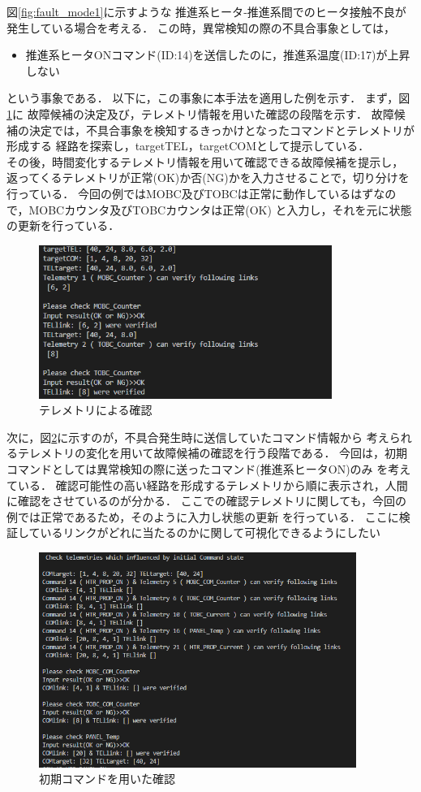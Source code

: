 \documentclass[11pt]{jsreport}
\begin{document}
図\ref{fig:fault_mode1}に示すような
推進系ヒータ‐推進系間でのヒータ接触不良が発生している場合を考える．
この時，異常検知の際の不具合事象としては，
\begin{itemize}
   \item 推進系ヒータONコマンド(ID:14)を送信したのに，推進系温度(ID:17)が上昇しない
\end{itemize}
という事象である．
以下に，この事象に本手法を適用した例を示す．
まず，図\ref{fig:tel_phase}に
故障候補の決定及び，テレメトリ情報を用いた確認の段階を示す．
故障候補の決定では，不具合事象を検知するきっかけとなったコマンドとテレメトリが形成する
経路を探索し，targetTEL，targetCOMとして提示している．\\
その後，時間変化するテレメトリ情報を用いて確認できる故障候補を提示し，
返ってくるテレメトリが正常(OK)か否(NG)かを入力させることで，切り分けを行っている．
今回の例ではMOBC及びTOBCは正常に動作しているはずなので，MOBCカウンタ及びTOBCカウンタは正常(OK)
と入力し，それを元に状態の更新を行っている．
\begin{figure}[H]
   \centering
      \includegraphics[height=5.0cm]{figure/COM14_TEL17_show_TEL_list.png}
      \caption{テレメトリによる確認}
      \label{fig:tel_phase}
\end{figure}
次に，図\ref{fig:ini_COM_phase}に示すのが，不具合発生時に送信していたコマンド情報から
考えられるテレメトリの変化を用いて故障候補の確認を行う段階である．
今回は，初期コマンドとしては異常検知の際に送ったコマンド(推進系ヒータON)のみ
を考えている．
確認可能性の高い経路を形成するテレメトリから順に表示され，人間に確認をさせているのが分かる．
ここでの確認テレメトリに関しても，今回の例では正常であるため，そのように入力し状態の更新
を行っている．
ここに検証しているリンクがどれに当たるのかに関して可視化できるようにしたい
\begin{figure}[H]
   \centering
      \includegraphics[height=7.0cm]{figure/COM14_TEL17_initial_COM.png}
      \caption{初期コマンドを用いた確認}
      \label{fig:ini_COM_phase}
\end{figure}
\end{document}

